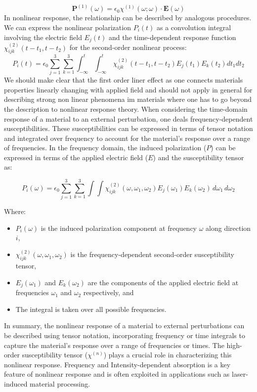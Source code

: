 \begin{equation}
	\mathbf{P}^{(1)}(\omega) =\epsilon_0 \chi^{(1)}(\omega;\omega) \cdot \mathbf{E}(\omega)
	\label{eqn:linearresponse-W}
\end{equation}
In nonlinear response, the relationship can be described by analogous procedures. We can express the nonlinear polarization $P_i(t)$ as a convolution integral involving the electric field $E_j(t)$ and the time-dependent response function $\chi^{(2)}_{ijk}(t-t_1,t-t_2)$ for the second-order nonlinear process:
\[
	P_i(t) = \epsilon_0 \sum_{j=1}^{3} \sum_{k=1}^{3}\int_{-\infty}^t \int_{-\infty}^t \, \chi^{(2)}_{ijk}(t-t_1,t-t_2) E_j(t_1)E_k(t_2) dt_1 dt_2
\]
We should make clear that the first order liner effect as one connects materials properties linearly changing with applied field and should not apply in general for describing strong non linear phenomena im materials where one has to go beyond the description to nonlinear response theory. When considering the time-domain response of a material to an external perturbation, one deals frequency-dependent susceptibilities. These susceptibilities can be expressed in terms of tensor notation and integrated over frequency to account for the material's response over a range of frequencies. In the frequency domain, the induced polarization ($P$) can be expressed in terms of the applied electric field ($E$) and the susceptibility tensor as:

\[
	P_i(\omega) = \epsilon_0 \sum_{j=1}^{3} \sum_{k=1}^{3}\int\int \chi^{(2)}_{ijk}(\omega, \omega_1, \omega_2) E_j(\omega_1) E_k(\omega_2) \, d\omega_1 \, d\omega_2
\]

Where:
\begin{itemize}
	\item $P_i(\omega)$ is the induced polarization component at frequency $\omega$ along direction
	      $i$,
	\item $\chi^{(2)}_{ijk}(\omega, \omega_1, \omega_2)$ is the frequency-dependent second-order susceptibility tensor,
	\item $E_j(\omega_1)$ and $E_k(\omega_2)$ are the components of the applied electric field at frequencies $\omega_1$ and $\omega_2$ respectively, and
	\item The integral is taken over all possible frequencies.
\end{itemize}

In summary, the nonlinear response of a material to external perturbations can be described using
tensor notation, incorporating frequency or time integrals to capture the material's response over
a range of frequencies or times. The high-order susceptibility tensor ($\chi^{(n)}$) plays a crucial role in characterizing this nonlinear response.
Frequency and Intensity-dependent absorption is a key feature of nonlinear response and is often exploited in applications such as laser-induced material processing.

